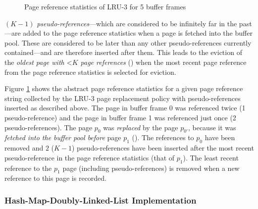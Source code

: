 \begin{@empty}
\begin{figure}[h]
        \vspace{-.125em}
        \vspace{.25em}
        \caption[Page reference statistics of LRU-K]{Page reference statistics of LRU-3 for 5 buffer frames}
        \label{fig:lru-k}
    \end{figure}
\end{@empty}

    $\left(K - 1\right)$ \emph{pseudo-references}---which are considered to be infinitely far in the past---are added to the page reference statistics when a page is fetched into the buffer pool. These are considered to be later than any other pseudo-references currently contained---and are therefore inserted after them. This leads to the eviction of the \emph{oldest page with $\mathord{<} K$ page references} () when the most recent page reference from the page reference statistics is selected for eviction.

    Figure \ref{fig:lru-k} shows the abstract page reference statistics for a given page reference string collected by the LRU-3 page replacement policy with pseudo-references inserted as described above. The page in buffer frame 0 was referenced twice (1 pseudo-reference) and the page in buffer frame 1 was referenced just once (2 pseudo-references). The page $p_0$ was \emph{replaced} by the page $p_{0'}$, because it was \emph{fetched into the buffer pool before} page $p_1$ (). The references to $p_0$ have been removed and $2$ ($K - 1$) pseudo-references have been inserted after the most recent pseudo-reference in the page reference statistics (that of $p_1$). The least recent reference to the $p_1$ page (including pseudo-references) is removed when a new reference to this page is recorded.

\subsubsection[Hash-Map-Doubly-Linked-List]{Hash-Map-Doubly-Linked-List Implementation} \label{subsubsec:lru-k_traditional}

